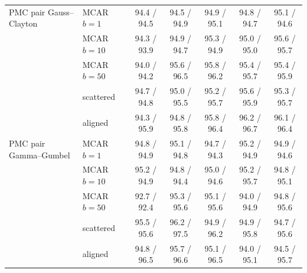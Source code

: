 \begin{table}[htbp]
\begin{tabular}{llccccc}
    \addlinespace
    PMC pair Gauss--Clayton & MCAR $b{=}1$ & 94.4 / 94.5 & 94.5 / 94.9 & 94.9 / 95.1 & 94.8 / 94.7 & 95.1 / 94.6 \\
     & MCAR $b{=}10$ & 94.3 / 93.9 & 94.9 / 94.7 & 95.3 / 94.9 & 95.0 / 95.0 & 95.6 / 95.7 \\
     & MCAR $b{=}50$ & 94.0 / 94.2 & 95.6 / 96.5 & 95.8 / 96.2 & 95.4 / 95.7 & 95.4 / 95.9 \\
     & scattered & 94.7 / 94.8 & 95.0 / 95.5 & 95.2 / 95.7 & 95.6 / 95.9 & 95.3 / 95.7 \\
     & aligned & 94.3 / 95.9 & 94.8 / 95.8 & 95.8 / 96.4 & 96.2 / 96.7 & 96.1 / 96.4 \\
    \addlinespace
    PMC pair Gamma--Gumbel & MCAR $b{=}1$ & 94.8 / 94.9 & 95.1 / 94.8 & 94.7 / 94.3 & 95.2 / 94.9 & 94.9 / 94.6 \\
     & MCAR $b{=}10$ & 95.2 / 94.9 & 94.8 / 94.4 & 95.0 / 94.6 & 95.2 / 95.7 & 94.8 / 95.1 \\
     & MCAR $b{=}50$ & 92.7 / 92.4 & 95.3 / 95.6 & 95.1 / 95.6 & 94.0 / 94.9 & 94.8 / 95.6 \\
     & scattered & 95.5 / 95.6 & 96.2 / 97.5 & 94.9 / 96.2 & 94.9 / 95.8 & 94.7 / 95.6 \\
     & aligned & 94.8 / 96.5 & 95.7 / 96.6 & 95.1 / 96.5 & 94.0 / 95.1 & 94.5 / 95.7 \\
    \bottomrule
  \end{tabular}
\end{table}
